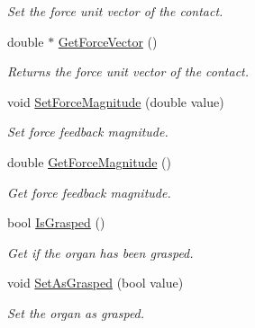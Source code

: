 \begin{DoxyCompactItemize}
\begin{DoxyCompactList}\small\item\em Set the force unit vector of the contact. \item\end{DoxyCompactList}\item 
\hypertarget{classvtkContact_ab3e4b9619877447f38069e84fda0d96c}{
double $\ast$ \hyperlink{classvtkContact_ab3e4b9619877447f38069e84fda0d96c}{GetForceVector} ()}
\label{classvtkContact_ab3e4b9619877447f38069e84fda0d96c}

\begin{DoxyCompactList}\small\item\em Returns the force unit vector of the contact. \item\end{DoxyCompactList}\item 
\hypertarget{classvtkContact_ae105b6024258661574919dd48733a9ab}{
void \hyperlink{classvtkContact_ae105b6024258661574919dd48733a9ab}{SetForceMagnitude} (double value)}
\label{classvtkContact_ae105b6024258661574919dd48733a9ab}

\begin{DoxyCompactList}\small\item\em Set force feedback magnitude. \item\end{DoxyCompactList}\item 
\hypertarget{classvtkContact_a3e5446478db7f31e74534e7533995e6d}{
double \hyperlink{classvtkContact_a3e5446478db7f31e74534e7533995e6d}{GetForceMagnitude} ()}
\label{classvtkContact_a3e5446478db7f31e74534e7533995e6d}

\begin{DoxyCompactList}\small\item\em Get force feedback magnitude. \item\end{DoxyCompactList}\item 
\hypertarget{classvtkContact_a00447c91dbc8fe27cb812e32b74fa20e}{
bool \hyperlink{classvtkContact_a00447c91dbc8fe27cb812e32b74fa20e}{IsGrasped} ()}
\label{classvtkContact_a00447c91dbc8fe27cb812e32b74fa20e}

\begin{DoxyCompactList}\small\item\em Get if the organ has been grasped. \item\end{DoxyCompactList}\item 
\hypertarget{classvtkContact_a4851a43c5e44f14b05824f6ffc1ee38a}{
void \hyperlink{classvtkContact_a4851a43c5e44f14b05824f6ffc1ee38a}{SetAsGrasped} (bool value)}
\label{classvtkContact_a4851a43c5e44f14b05824f6ffc1ee38a}

\begin{DoxyCompactList}\small\item\em Set the organ as grasped. \item\end{DoxyCompactList}\end{DoxyCompactItemize}

